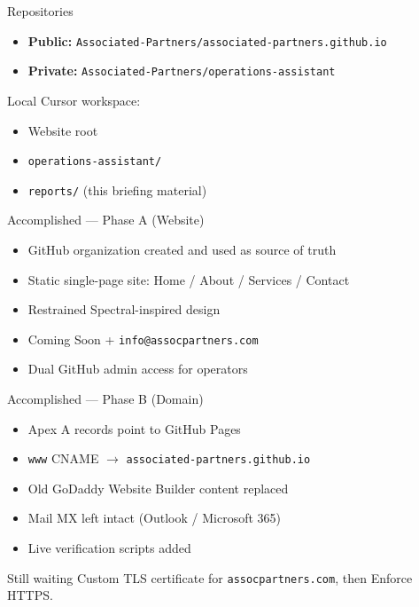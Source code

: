\documentclass[aspectratio=169,11pt]{beamer}
\begin{document}
\begin{frame}{Repositories}
  \begin{itemize}
    \item \textbf{Public:}
      \texttt{Associated-Partners/associated-partners.github.io}
    \item \textbf{Private:}
      \texttt{Associated-Partners/operations-assistant}
  \end{itemize}

  \vspace{0.8em}
  Local Cursor workspace:
  \begin{itemize}
    \item Website root
    \item \texttt{operations-assistant/}
    \item \texttt{reports/} (this briefing material)
  \end{itemize}
\end{frame}

\begin{frame}{Accomplished --- Phase A (Website)}
  \begin{itemize}
    \item GitHub organization created and used as source of truth
    \item Static single-page site: Home / About / Services / Contact
    \item Restrained Spectral-inspired design
    \item Coming Soon + \texttt{info@assocpartners.com}
    \item Dual GitHub admin access for operators
  \end{itemize}
\end{frame}

\begin{frame}{Accomplished --- Phase B (Domain)}
  \begin{itemize}
    \item Apex A records point to GitHub Pages
    \item \texttt{www} CNAME $\rightarrow$ \texttt{associated-partners.github.io}
    \item Old GoDaddy Website Builder content replaced
    \item Mail MX left intact (Outlook / Microsoft 365)
    \item Live verification scripts added
  \end{itemize}

  \vspace{0.6em}
  \begin{block}{Still waiting}
    Custom TLS certificate for \texttt{assocpartners.com}, then Enforce HTTPS.
  \end{block}
\end{frame}
\end{document}
